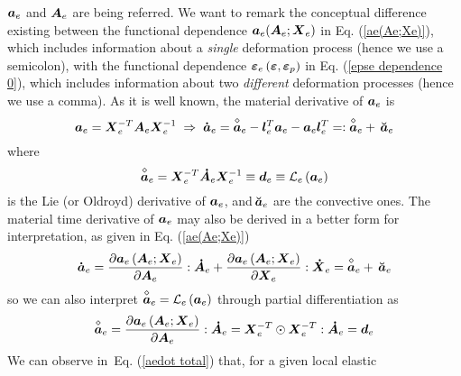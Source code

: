 \documentclass[preprint,review,12pt,sort&compress]{elsarticle}%
\renewcommand{\mathbf}[1]{\mbox{\boldmath $#1$ \unboldmath}  \!\!}
\begin{document}
$\mathbf{a}_{e}$ and $\mathbf{A}_{e}$ are being referred. We want to remark
the conceptual difference existing between the functional dependence
$\mathbf{a}_{e}(\mathbf{A}_{e};\mathbf{X}_{e})$ in Eq. (\ref{ae(Ae;Xe)}),
which includes information about a \emph{single} deformation process (hence we
use a semicolon), with the functional dependence $\mathbf{\varepsilon}%
_{e}\left(  \mathbf{\varepsilon},\mathbf{\varepsilon}_{p}\right)  $ in Eq.
(\ref{epse dependence 0}), which includes information about two
\emph{different} deformation processes (hence we use a comma). As it is well
known, the material derivative of $\mathbf{a}_{e}$ is%
\begin{equation}
\mathbf{a}_{e}=\mathbf{X}_{e}^{-T}\mathbf{A}_{e}\mathbf{X}_{e}^{-1}%
\;\Rightarrow\;\mathbf{\dot{a}}_{e}=\overset{\diamond}{\mathbf{a}}%
_{e}-\mathbf{l}_{e}^{T}\mathbf{a}_{e}-\mathbf{a}_{e}\mathbf{l}_{e}%
^{T}=:\overset{\diamond}{\mathbf{a}}_{e}+\,\mathbf{\breve{a}}_{e}%
\end{equation}
where%
\begin{equation}
\overset{\diamond}{\mathbf{a}}_{e}=\mathbf{X}_{e}^{-T}\mathbf{\dot{A}}%
_{e}\mathbf{X}_{e}^{-1}\equiv\mathbf{d}_{e}\equiv\mathcal{L}_{e}\left(
\mathbf{a}_{e}\right)
\end{equation}
is the Lie (or Oldroyd) derivative of $\mathbf{a}_{e}$, and$\,\mathbf{\breve
{a}}_{e}$ are the convective ones. The material time derivative of
$\mathbf{a}_{e}$ may also be derived in a better form for interpretation, as
given in Eq. (\ref{ae(Ae;Xe)})%
\begin{equation}
\mathbf{\dot{a}}_{e}=\frac{\partial\mathbf{a}_{e}\left(  \mathbf{A}%
_{e};\mathbf{X}_{e}\right)  }{\partial\mathbf{A}_{e}}:\mathbf{\dot{A}}%
_{e}+\frac{\partial\mathbf{a}_{e}\left(  \mathbf{A}_{e};\mathbf{X}_{e}\right)
}{\partial\mathbf{X}_{e}}:\mathbf{\dot{X}}_{e}=\overset{\diamond}{\mathbf{a}%
}_{e}+\,\mathbf{\breve{a}}_{e} \label{aedot total}%
\end{equation}
so we can also interpret $\overset{\diamond}{\mathbf{a}}_{e}=\mathcal{L}%
_{e}\left(  \mathbf{a}_{e}\right)  $ through partial differentiation as%
\begin{equation}
\overset{\diamond}{\mathbf{a}}_{e}=\frac{\partial\mathbf{a}_{e}\left(
\mathbf{A}_{e};\mathbf{X}_{e}\right)  }{\partial\mathbf{A}_{e}}:\mathbf{\dot
{A}}_{e}=\mathbf{X}_{e}^{-T}\odot\mathbf{X}_{e}^{-T}:\mathbf{\dot{A}}%
_{e}=\mathbf{d}_{e} \label{aedot objective}%
\end{equation}
We can observe in\ Eq. (\ref{aedot total}) that, for a given local elastic
\end{document}
